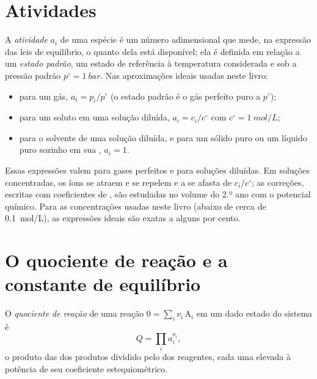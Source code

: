 \section{Atividades}

\begin{definition}\label{def:b1:extent-q-and-k:activity}
A \emph{atividade} $a_i$ de uma espécie é um número
adimensional que mede, na expressão das leis de equilíbrio, o quanto
dela está disponível; ela é definida em relação a um \emph{estado
padrão}, um estado de referência à
temperatura considerada e sob a pressão padrão $p^\circ = \qty{1}{bar}$.
Nas aproximações ideais usadas neste livro:
\begin{itemize}
  \item para um gás, $a_i = p_i/p^\circ$ (o estado padrão é o gás
        perfeito puro a $p^\circ$);
  \item para um soluto em uma solução diluída, $a_i = c_i/c^\circ$ com
        $c^\circ = \qty{1}{mol/L}$;
  \item para o solvente de uma solução diluída, e para um sólido puro ou
        um líquido puro sozinho em sua , $a_i = 1$.
\end{itemize}
\end{definition}

\begin{remark}\label{rem:b1:extent-q-and-k:ideal}
Essas expressões valem para gases perfeitos e para soluções diluídas. Em
soluções concentradas, os íons se atraem e se repelem e a  se
afasta de $c_i/c^\circ$; as correções, escritas com coeficientes de
, são estudadas no volume do 2.º ano com o potencial químico.
Para as concentrações usadas neste livro (abaixo de cerca de
\qty{0.1}{mol/L}), as expressões ideais são exatas a alguns por cento.
\end{remark}

\section{O quociente de reação e a constante de equilíbrio}

\begin{definition}\label{def:b1:extent-q-and-k:quotient}
O \emph{quociente de reação} de uma reação
$0 = \sum_i \nu_i\,\mathrm{A}_i$ em um dado estado do sistema é
\[
  Q = \prod_i a_i^{\nu_i} ,
\]
o produto das  dos produtos dividido pelo dos reagentes, cada
uma elevada à potência de seu coeficiente estequiométrico.
\end{definition}

